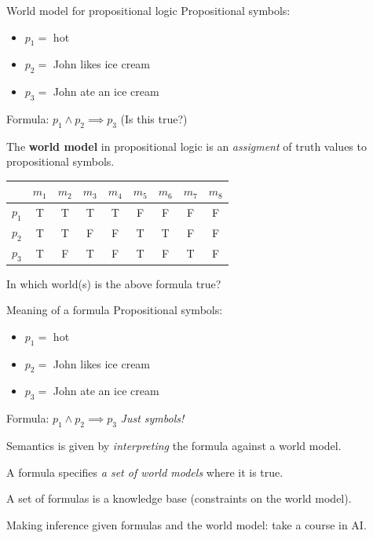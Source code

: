 \documentclass[usenames,dvipsnames,notes]{beamer}
\begin{document}
\begin{frame}
    {World model for propositional logic}
    Propositional symbols:\\
    \begin{itemize}
        \item[] $p_1=$ hot
    \item[] $p_2=$ John likes ice cream
    \item[] $p_3=$ John ate an ice cream
    \end{itemize}

    Formula: $p_1 \land p_2 \implies p_3$ (Is this true?)
    \pause

    The \textbf{world model} in propositional logic is an \emph{assigment} of truth values to propositional symbols.
    \begin{table}
        \begin{tabular}{c|cccccccc}
            & $m_1$ & $m_2$ &$m_3$ &$m_4$ &$m_5$ &$m_6$ &$m_7$ &$m_8$ \\
            \midrule
            $p_1$ & T & T &T &T &F &F &F &F \\
            $p_2$ & T & T &F &F &T &T &F &F \\
            $p_3$ & T & F &T &F &T &F &T &F \\
        \end{tabular}
    \end{table}
    In which world(s) is the above formula true?
\end{frame}

\begin{frame}
    {Meaning of a formula}
    Propositional symbols:\\
    \begin{itemize}
        \item[] $p_1=$ hot
        \item[] $p_2=$ John likes ice cream
        \item[] $p_3=$ John ate an ice cream
    \end{itemize}
    Formula: $p_1 \land p_2 \implies p_3$  \hspace{2em} \emph{Just symbols!}

    Semantics is given by \emph{interpreting}  the formula against a world model.

    A formula specifies \emph{a set of world models} where it is true.

    A set of formulas is a knowledge base (constraints on the world model).

    Making inference given formulas and the world model: take a course in AI.
\end{frame}
\end{document}
